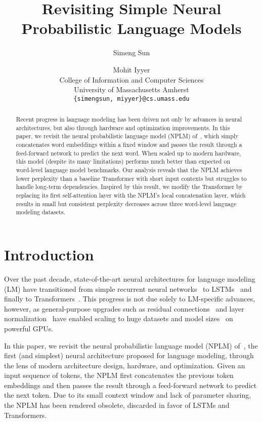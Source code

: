 \documentclass[11pt]{article}
\title{Revisiting Simple Neural Probabilistic Language Models}
\author{Simeng Sun \and Mohit Iyyer \\
        College of Information and Computer Sciences\\ University of Massachusetts Amherst \\
        \texttt{\{simengsun, miyyer\}@cs.umass.edu}}
\begin{document}
\maketitle

\newcommand\wtthree{\textsc{Wikitext-103}}
\newcommand\wttwo{\textsc{Wikitext-2}}
\newcommand\lambada{\textsc{lambada}}
\newcommand\enwik{\textsc{enwik8}}
\newcommand{\bmat}[1]{\text{\textbf{#1}}}
\newcommand{\bvec}[1]{\boldsymbol{#1}}

\begin{abstract}
Recent progress in language modeling has been driven not only by advances in neural architectures, but also through hardware and optimization improvements. In this paper, we revisit the neural probabilistic language model (NPLM) of~\citet{Bengio2003ANP}, which simply concatenates word embeddings within a fixed window and passes the result through a feed-forward network to predict the next word. When scaled up to modern hardware, this model (despite its many limitations) performs much better than expected on word-level language model benchmarks. Our analysis reveals that the NPLM achieves lower perplexity than a baseline Transformer with short input contexts but struggles to handle long-term dependencies. Inspired by this result, we modify the Transformer by replacing its first self-attention layer with the NPLM's local concatenation layer, which results in small but consistent perplexity decreases across three word-level language modeling datasets.  
\end{abstract}


 \section{Introduction}



Over the past decade, state-of-the-art neural architectures for language modeling (LM) have transitioned from simple recurrent neural networks~\citep{mikolov2011extensions} to LSTMs~\citep{zaremba2014recurrent} and finally to Transformers~\citep{NIPS2017_3f5ee243}. This progress is not due solely to LM-specific advances, however, as general-purpose upgrades such as residual connections~\citep{he2016deep} and layer normalization~\citep{ba2016layer} have enabled scaling to huge datasets and model sizes~\citep{kaplan2020scaling} on powerful GPUs.

In this paper, we revisit the neural probabilistic language model (NPLM) of~\citet{Bengio2003ANP}, the first (and simplest) neural architecture proposed for language modeling, through the lens of modern architecture design, hardware, and optimization. Given an input sequence of tokens, the NPLM first concatenates the previous  token embeddings and then passes the result through a feed-forward network to predict the next token. Due to its small context window and lack of parameter sharing, the NPLM has been rendered obsolete, discarded in favor of LSTMs and Transformers.
\end{document}
